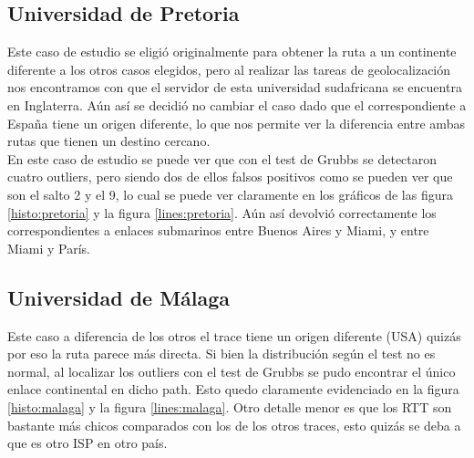 \subsection{Universidad de Pretoria}
Este caso de estudio se eligió originalmente para obtener la ruta a un continente diferente a los otros casos elegidos, pero al realizar las tareas de geolocalización nos encontramos con que el servidor de esta universidad sudafricana se encuentra en Inglaterra. Aún así se decidió no cambiar el caso dado que el correspondiente a España tiene un origen diferente, lo que nos permite ver la diferencia entre ambas rutas que tienen un destino cercano. \\
En este caso de estudio se puede ver que con el test de Grubbs se detectaron cuatro outliers, pero siendo dos de ellos falsos positivos como se pueden ver que son el salto 2 y el 9, lo cual se puede ver claramente en los gráficos de las figura \ref{histo:pretoria} y la figura \ref{lines:pretoria}. Aún así devolvió correctamente los correspondientes a enlaces submarinos entre Buenos Aires y Miami, y entre Miami y París.

\subsection{Universidad de Málaga}
Este caso a diferencia de los otros el trace tiene un origen diferente (USA) quizás por eso la ruta parece más directa.
Si bien la distribución según el test no es normal, al localizar los outliers con el test de Grubbs se pudo encontrar el único enlace continental en dicho path. Esto quedo claramente evidenciado en la figura \ref{histo:malaga} y la figura \ref{lines:malaga}.
Otro detalle menor es que los RTT son bastante más chicos comparados con los de los otros traces, esto quizás se deba a que es otro ISP en otro país.



